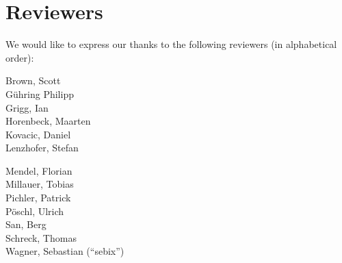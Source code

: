\newpage
\section{Reviewers}
\label{section:Reviewers}

We would like to express our thanks to the following reviewers (in alphabetical order):


\vline{}

\begin{minipage}[b]{0.5\linewidth}
\center
Brown, Scott \\
G\"uhring Philipp  \\
Grigg, Ian  \\
Horenbeck, Maarten \\
Kovacic, Daniel \\
Lenzhofer, Stefan \\
\end{minipage}
\begin{minipage}[b]{0.5\linewidth}
\center
Mendel, Florian \\
Millauer, Tobias \\
Pichler, Patrick \\
P\"oschl, Ulrich \\
San, Berg \\
Schreck, Thomas  \\
Wagner, Sebastian (``sebix'') \\
\end{minipage}




